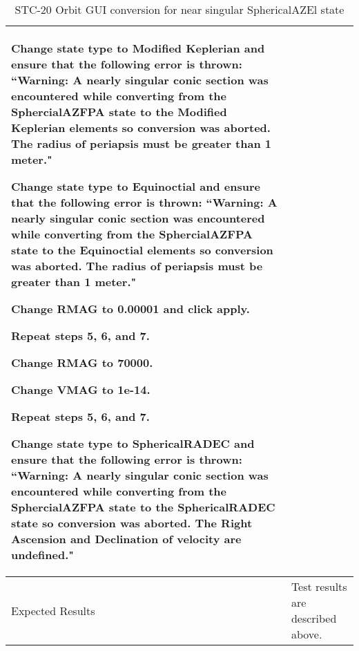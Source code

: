 \begin{table}[htbp!]
\begin{tabular}{|p{1.05 in} |p{4.75 in} |}
\begin{compactenum}
             \item Change state type to Modified Keplerian and ensure that the following error is thrown: ``Warning: A nearly singular conic section was encountered while converting from the SphercialAZFPA state to the Modified Keplerian elements so conversion was aborted.  The radius of periapsis must be greater than 1 meter."
             \item Change state type to Equinoctial and ensure that the following error is thrown:  ``Warning: A nearly singular conic section was encountered while converting from the SphercialAZFPA state to the Equinoctial elements so conversion was aborted.  The radius of periapsis must be greater than 1 meter."
                 \item Change RMAG to 0.00001 and click apply.
                 \item Repeat steps 5, 6, and 7.
                 \item Change RMAG to 70000.
                 \item Change VMAG to 1e-14.
                 \item Repeat steps 5, 6, and 7.
                 \item Change state type to SphericalRADEC and ensure that the following error is thrown: ``Warning: A nearly singular conic section was encountered while converting from the SphercialAZFPA state to the SphericalRADEC state so conversion was aborted.  The Right Ascension and Declination of velocity are undefined."
         \end{compactenum}
         \\ \hline
         Expected Results & Test results are described above.\\
      \hline
      \end{tabular}
      \label{Table:STC-20}
      \caption{STC-20 Orbit GUI conversion for near singular SphericalAZEl state}
\end{table} 


